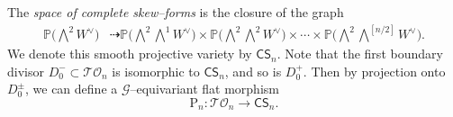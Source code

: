 \documentclass[10pt]{amsart}
\theoremstyle{definition}
\newcommand{\CS}{\mathsf{CS}}
\newcommand{\TO}{\mathcal{TO}}
\newcommand{\PL}{\mathrm{P}}
\theoremstyle{plain} %
\begin{document}
The \emph{space of complete skew--forms} is the closure of the graph
\begin{equation*}
\begin{split}
\mathbb P\big(\bigwedge\nolimits^2W^\vee\big)&\dashrightarrow
\mathbb P\big(\bigwedge\nolimits^2\bigwedge\nolimits^{1}W^\vee\big)\times\mathbb P\big(\bigwedge\nolimits^2\bigwedge\nolimits^{2}W^\vee\big)\times\cdots\times\mathbb P\big(\bigwedge\nolimits^2\bigwedge\nolimits^{[n/2]}W^\vee\big).   
\end{split}    
\end{equation*}
We denote this smooth projective variety by $\CS_n$. Note that the first boundary divisor $D_0^-\subset\TO_n$ is isomorphic to $\CS_n$, and so is $D_0^+$. Then by projection onto $D_0^{\pm}$, we can define a $\mathscr G$--equivariant flat morphism
\begin{equation}\label{opln}
\PL_n \colon \TO_n \longrightarrow \CS_n.   
\end{equation}
\end{document}
